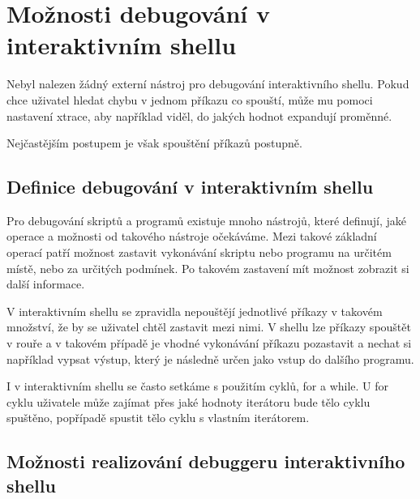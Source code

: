 \documentclass[thesis=M,czech]{FITthesis}[2012/06/26]
\begin{document}




%
%
%
%
%
\section{Možnosti debugování v interaktivním shellu}

Nebyl nalezen žádný externí nástroj pro debugování interaktivního shellu. Pokud chce uživatel hledat chybu v jednom příkazu co spouští, může mu pomoci nastavení xtrace, aby například viděl, do jakých hodnot expandují proměnné.

Nejčastějším postupem je však spouštění příkazů postupně.

%
%
\subsection{Definice debugování v interaktivním shellu}


Pro debugování skriptů a programů existuje mnoho nástrojů, které definují, jaké operace a možnosti od takového nástroje očekáváme. Mezi takové základní operací patří možnost zastavit vykonávání skriptu nebo programu na určitém místě, nebo za určitých podmínek. Po takovém zastavení mít možnost zobrazit si další informace.

V interaktivním shellu se zpravidla nepouštějí jednotlivé příkazy v takovém množství, že by se uživatel chtěl zastavit mezi nimi. V shellu lze příkazy spouštět v rouře a v takovém případě je vhodné vykonávání příkazu pozastavit a nechat si například vypsat výstup, který je následně určen jako vstup do dalšího programu.

I v interaktivním shellu se často setkáme s použitím cyklů, for a while. U for cyklu uživatele může zajímat přes jaké hodnoty iterátoru bude tělo cyklu spuštěno, popřípadě spustit tělo cyklu s vlastním iterátorem.




\subsection{Možnosti realizování debuggeru interaktivního shellu}
\end{document}
